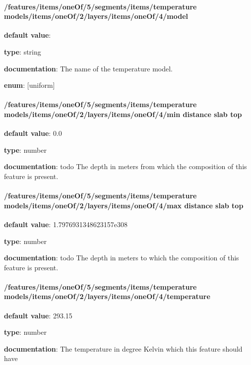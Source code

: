 \paragraph{/features/items/oneOf/5/segments/items/temperature models/items/oneOf/2/layers/items/oneOf/4/model} \begin{itemized}
\item {\bf default value}: 
\item {\bf type}: string
\item {\bf documentation}: The name of the temperature model.
\item {\bf enum}: [uniform]\end{itemized}\paragraph{/features/items/oneOf/5/segments/items/temperature models/items/oneOf/2/layers/items/oneOf/4/min distance slab top} \begin{itemized}
\item {\bf default value}: 0.0
\item {\bf type}: number
\item {\bf documentation}: todo The depth in meters from which the composition of this feature is present.
\end{itemized}\paragraph{/features/items/oneOf/5/segments/items/temperature models/items/oneOf/2/layers/items/oneOf/4/max distance slab top} \begin{itemized}
\item {\bf default value}: 1.7976931348623157e308
\item {\bf type}: number
\item {\bf documentation}: todo The depth in meters to which the composition of this feature is present.
\end{itemized}\paragraph{/features/items/oneOf/5/segments/items/temperature models/items/oneOf/2/layers/items/oneOf/4/temperature} \begin{itemized}
\item {\bf default value}: 293.15
\item {\bf type}: number
\item {\bf documentation}: The temperature in degree Kelvin which this feature should have

\end{itemized}
